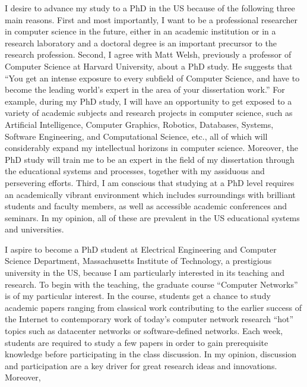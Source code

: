 \documentclass[a4paper,10pt]{report}
\newcommand{\university}{Massachusetts Institute of Technology}
\newcommand{\department}{Electrical Engineering and Computer Science Department}
\begin{document}
\vspace{0.2cm}
I desire to advance my study to a PhD in the US because of the following three main reasons. First and most importantly, I want to be a professional researcher in computer science in the future, either in an academic institution or in a research laboratory and a doctoral degree is an important precursor to the research profession. Second, I agree with Matt Welsh, previously a professor of Computer Science at Harvard University, about a PhD study. He suggests that ``You get an intense exposure to every subfield of Computer Science, and have to become the leading world's expert in the area of your dissertation work.'' For example, during my PhD study, I will have an opportunity to get exposed to a variety of academic subjects and research projects in computer science, such as Artificial Intelligence, Computer Graphics, Robotics, Databases, Systems, Software Engineering, and Computational Science, etc., all of which will considerably expand my intellectual horizons in computer science. Moreover, the PhD study will train me to be an expert in the field of my dissertation through the educational systems and processes, together with my assiduous and persevering efforts. Third, I am conscious that studying at a PhD level requires an academically vibrant environment which includes surroundings with brilliant students and faculty members, as well as accessible academic conferences and seminars. In my opinion, all of these are prevalent in the US educational systems and universities.

\vspace{0.2cm}
I aspire to become a PhD student at \department, \university, a prestigious university in the US, because I am particularly interested in its teaching and research. To begin with the teaching, the graduate course ``Computer Networks'' is of my particular interest. In the course, students get a chance to study academic papers ranging from classical work contributing to the earlier success of the Internet to contemporary work of today's computer network research ``hot'' topics such as datacenter networks or software-defined networks. Each week, students are required to study a few papers in order to gain prerequisite knowledge before participating in the class discussion. In my opinion, discussion and participation are a key driver for great research ideas and innovations. Moreover, 
\end{document}

